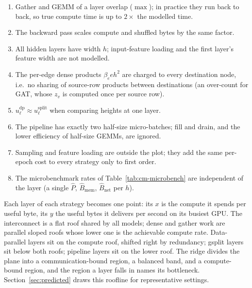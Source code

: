 \begin{enumerate}\itemsep1pt
  \item Gather and GEMM of a layer overlap ($\max$); in practice they run back to back, so true
        compute time is up to $2\times$ the modelled time.
  \item The backward pass scales compute and shuffled bytes by the same factor.
  \item All hidden layers have width $h$; input-feature loading and the first layer's feature
        width are not modelled.
  \item The per-edge dense products $\beta_e e h^2$ are charged to every destination node,
        i.e.\ no sharing of source-row products between destinations (an over-count for GAT,
        whose $z_v$ is computed once per source row).
  \item $u^{\mathrm{dp}}_\ell \approx u^{\mathrm{split}}_\ell$ when comparing heights at one
        layer.
  \item The pipeline has exactly two half-size micro-batches; fill and drain, and the lower
        efficiency of half-size GEMMs, are ignored.
  \item Sampling and feature loading are outside the plot; they add the same per-epoch cost to
        every strategy only to first order.
  \item The microbenchmark rates of Table~\ref{tab:cm-microbench} are independent of the layer
        (a single $\hat{P}$, $\hat{B}_{\mathrm{mem}}$, $\hat{B}_{\mathrm{net}}$ per $h$).
\end{enumerate}

Each layer of each strategy becomes one point: its $x$ is the compute it spends per useful byte,
its $y$ the useful bytes it delivers per second on its busiest GPU. The interconnect is a flat
roof shared by all models; dense and gather work are parallel sloped roofs whose lower one is the
achievable compute rate. Data-parallel layers sit on the compute roof, shifted right by
redundancy; gsplit layers sit below both roofs; pipeline layers sit on the lower roof. The ridge
divides the plane into a communication-bound region, a balanced band, and a compute-bound
region, and the region a layer falls in names its bottleneck. Section~\ref{sec:predicted} draws
this roofline for representative settings.
